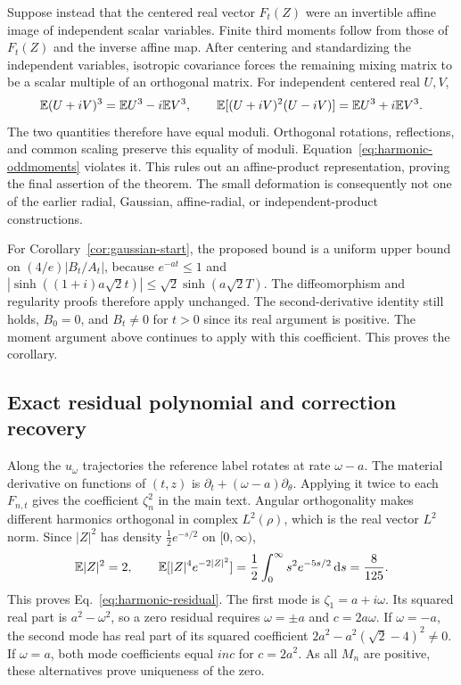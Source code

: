 Suppose instead that the centered real vector $F_t(Z)$ were an
invertible affine image of independent scalar variables. Finite third
moments follow from those of $F_t(Z)$ and the inverse affine map.
After centering and standardizing the independent variables, isotropic
covariance forces the remaining mixing matrix to be a scalar multiple
of an orthogonal matrix. For independent centered real $U,V$,
\[
 \mathbb E(U+iV)^3=\mathbb E U^3-i\mathbb E V^3,\qquad
 \mathbb E[(U+iV)^2(U-iV)]=\mathbb E U^3+i\mathbb E V^3.
\]
The two quantities therefore have equal moduli. Orthogonal rotations,
reflections, and common scaling preserve this equality of moduli.
Equation~\eqref{eq:harmonic-oddmoments} violates it. This rules out an
affine-product representation, proving the final assertion of the
theorem. The small deformation is consequently not one of the earlier
radial, Gaussian, affine-radial, or independent-product constructions.

For Corollary~\ref{cor:gaussian-start}, the proposed bound is a uniform
upper bound on $(4/e)|B_t/A_t|$, because $e^{-at}\le1$ and
$|\sinh((1+i)a\sqrt2t)|\le\sqrt2\sinh(a\sqrt2T)$.
The diffeomorphism and regularity proofs therefore apply unchanged.
The second-derivative identity still holds, $B_0=0$, and $B_t\ne0$ for
$t>0$ since its real argument is positive. The moment argument above
continues to apply with this coefficient. This proves the corollary.

\subsection{Exact residual polynomial and correction recovery}

Along the $u_\omega$ trajectories the reference label rotates at rate
$\omega-a$. The material derivative on functions of $(t,z)$ is
$\partial_t+(\omega-a)\partial_\theta$. Applying it twice to each
$F_{n,t}$ gives the coefficient $\zeta_n^2$ in the main text.
Angular orthogonality makes different harmonics orthogonal in complex
$L^2(\rho)$, which is the real vector $L^2$ norm. Since
$|Z|^2$ has density $\tfrac12e^{-s/2}$ on $[0,\infty)$,
\[
 \mathbb E|Z|^2=2,\qquad
 \mathbb E[|Z|^4e^{-2|Z|^2}]
 =\frac12\int_0^\infty s^2e^{-5s/2}\,\mathrm d s=\frac8{125}.
\]
This proves Eq.~\eqref{eq:harmonic-residual}. The first mode is
$\zeta_1=a+i\omega$. Its squared real part is $a^2-\omega^2$, so a
zero residual requires $\omega=\pm a$ and $c=2a\omega$.
If $\omega=-a$, the second mode has real part of its squared
coefficient $2a^2-a^2(\sqrt2-4)^2\ne0$. If $\omega=a$, both mode
coefficients equal $inc$ for $c=2a^2$. As all $M_n$ are positive,
these alternatives prove uniqueness of the zero.

